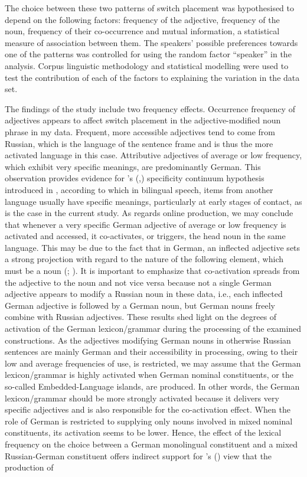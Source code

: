 The choice between these two patterns of switch placement was hypothesised to depend on the following factors: frequency of the adjective, frequency of the noun, frequency of their co-occurrence and mutual information, a statistical measure of association between them. The speakers' possible preferences towards one of the patterns was controlled for using the random factor “speaker” in the analysis. Corpus linguistic methodology and statistical modelling were used to test the contribution of each of the factors to explaining the variation in the data set.

The findings of the study include two frequency effects. Occurrence frequency of adjectives appears to affect switch placement in the adjective-modified noun phrase in my data. Frequent, more accessible adjectives tend to come from Russian, which is the language of the sentence frame and is thus the more activated language in this case. Attributive adjectives of average or low frequency, which exhibit very specific meanings, are predominantly German. This observation provides evidence for \citeauthor{backus-evidence-1999}’s (\citeyear{backus-evidence-1999},\citeyear{backus-units-2003}) specificity continuum hypothesis introduced in , according to which in bilingual speech, items from another language usually have specific meanings, particularly at early stages of contact, as is the case in the current study. As regards online production, we may conclude that whenever a very specific German adjective of average or low frequency is activated and accessed, it co-activates, or triggers, the head noun in the same language. This may be due to the fact that in German, an inflected adjective sets a strong projection with regard to the nature of the following element, which must be a noun (\citealt[][98]{auer_syntax_2007}; \citealt[cf.][]{auer_projection_2005}). It is important to emphasize that co-activation spreads from the adjective to the noun and not vice versa because not a single German adjective appears to modify a Russian noun in these data, i.e., each inflected German adjective is followed by a German noun, but German nouns freely combine with Russian adjectives. These results shed light on the degrees of activation of the German lexicon/grammar during the processing of the examined constructions. As the adjectives modifying German nouns in otherwise Russian sentences are mainly German and their accessibility in processing, owing to their low and average frequencies of use, is restricted, we may assume that the German lexicon/grammar is highly activated when German nominal constituents, or the so-called Embedded-Language islands, are produced. In other words, the German lexicon/grammar should be more strongly activated because it delivers very specific adjectives and is also responsible for the co-activation effect. When the role of German is restricted to supplying only nouns involved in mixed nominal constituents, its activation seems to be lower. Hence, the effect of the lexical frequency on the choice between a German monolingual constituent and a mixed Russian-German constituent offers indirect support for \citeauthor{myers-scotton-contact-2002}’s (\citeyear[][140]{myers-scotton-contact-2002}) view that the production of 